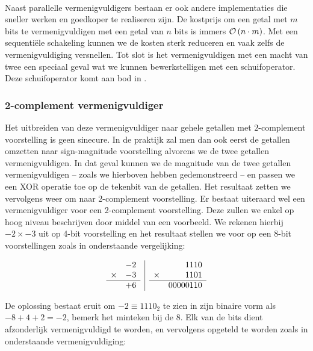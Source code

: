 \paragraph{}
Naast parallelle vermenigvuldigers bestaan er ook andere implementaties die sneller werken en goedkoper te realiseren zijn. De kostprijs om een getal met $m$ bits te vermenigvuldigen met een getal van $n$ bits is immers $\mathcal{O}\left( n\cdot m \right)$. Met een sequenti\"ele schakeling kunnen we de kosten sterk reduceren en vaak zelfs de vermenigvuldiging versnellen. Tot slot is het vermenigvuldigen met een macht van twee een speciaal geval wat we kunnen bewerkstelligen met een schuifoperator. Deze schuifoperator komt aan bod in .

\subsubsection{2-complement vermenigvuldiger}
Het uitbreiden van deze vermenigvuldiger naar gehele getallen met $2$-complement voorstelling is geen sinecure. In de praktijk zal men dan ook eerst de getallen omzetten naar sign-magnitude voorstelling alvorens we de twee getallen vermenigvuldigen. In dat geval kunnen we de magnitude van de twee getallen vermenigvuldigen -- zoals we hierboven hebben gedemonstreerd -- en passen we een XOR operatie toe op de tekenbit van de getallen. Het resultaat zetten we vervolgens weer om naar 2-complement voorstelling. Er bestaat uiteraard wel een vermenigvuldiger voor een 2-complement voorstelling. Deze zullen we enkel op hoog niveau beschrijven door middel van een voorbeeld. We rekenen hierbij $-2\times -3$ uit op 4-bit voorstelling en het resultaat stellen we voor op een 8-bit voorstellingen zoals in onderstaande vergelijking:

\begin{equation}
\begin{array}{l|r}
 \begin{array}{lr}
&-2\\
\times&-3\\\hline
&+6
\end{array}&\begin{array}{lr}
&1110\\
\times&1101\\\hline
&00000110
\end{array}
\end{array}
\end{equation}

De oplossing bestaat eruit om $-2\equiv 1110_2$ te zien in zijn binaire vorm als $-8+4+2=-2$, bemerk het minteken bij de $8$. Elk van de bits dient afzonderlijk vermenigvuldigd te worden, en vervolgens opgeteld te worden zoals in onderstaande vermenigvuldiging:

